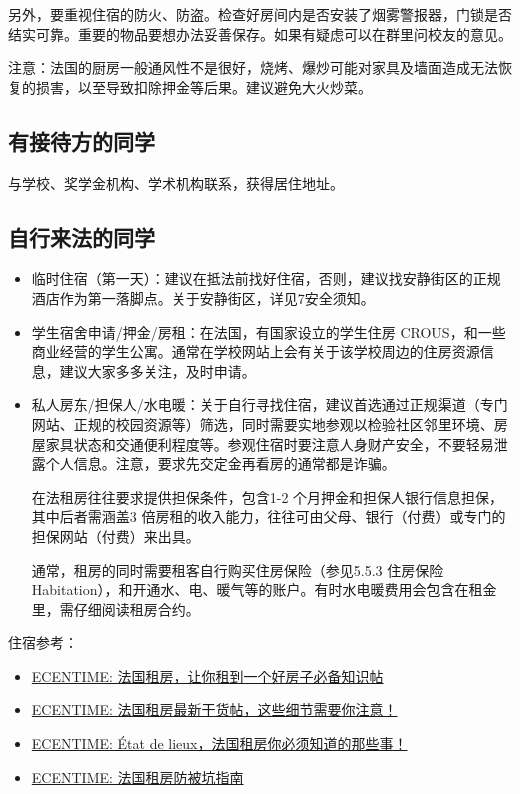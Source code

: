 \documentclass[UTF8]{ctexart}
\begin{document}
另外，要重视住宿的防火、防盗。检查好房间内是否安装了烟雾警报器，门锁是否结实可靠。重要的物品要想办法妥善保存。如果有疑虑可以在群里问校友的意见。

注意：法国的厨房一般通风性不是很好，烧烤、爆炒可能对家具及墙面造成无法恢复的损害，以至导致扣除押金等后果。建议避免大火炒菜。

\subsection{有接待方的同学}
与学校、奖学金机构、学术机构联系，获得居住地址。

\subsection{自行来法的同学}
\begin{itemize}
    \item 临时住宿（第一天）：建议在抵法前找好住宿，否则，建议找安静街区的正规酒店作为第一落脚点。关于安静街区，详见7安全须知。
    \item 学生宿舍申请/押金/房租：在法国，有国家设立的学生住房 CROUS，和一些商业经营的学生公寓。通常在学校网站上会有关于该学校周边的住房资源信息，建议大家多多关注，及时申请。
    \item 私人房东/担保人/水电暖：关于自行寻找住宿，建议首选通过正规渠道（专门网站、正规的校园资源等）筛选，同时需要实地参观以检验社区邻里环境、房屋家具状态和交通便利程度等。参观住宿时要注意人身财产安全，不要轻易泄露个人信息。注意，要求先交定金再看房的通常都是诈骗。
    
    在法租房往往要求提供担保条件，包含1-2 个月押金和担保人银行信息担保，其中后者需涵盖3 倍房租的收入能力，往往可由父母、银行（付费）或专门的担保网站（付费）来出具。
    
    通常，租房的同时需要租客自行购买住房保险（参见5.5.3 住房保险Habitation），和开通水、电、暖气等的账户。有时水电暖费用会包含在租金里，需仔细阅读租房合约。
\end{itemize}

住宿参考：
\begin{itemize}
    \item \href{https://www.ecentime.com/article/location-logement}{ECENTIME: 法国租房，让你租到一个好房子必备知识帖}
    \item \href{https://www.ecentime.com/article/location-en-france}{ECENTIME: 法国租房最新干货帖，这些细节需要你注意！}
    \item \href{https://www.ecentime.com/article/connaissances-sur-etat-des-lieux}{ECENTIME: État de lieux，法国租房你必须知道的那些事！}
    \item \href{https://www.ecentime.com/article/location-en-france-tuto}{ECENTIME: 法国租房防被坑指南}
\end{itemize}
\end{document}
